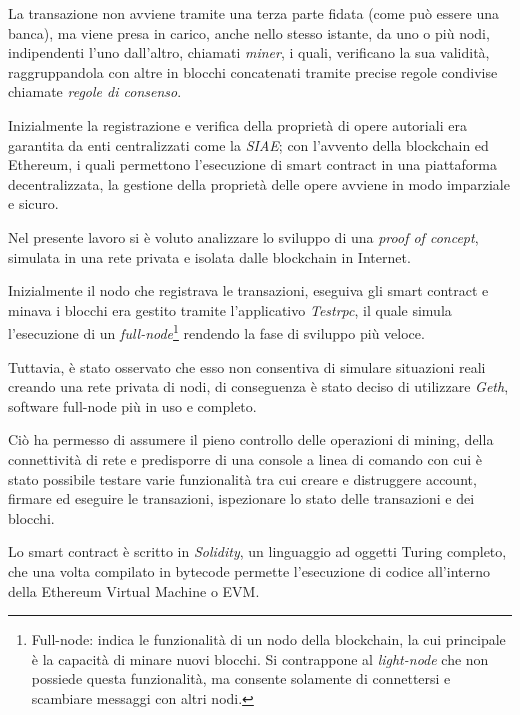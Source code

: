 \documentclass[11pt,oneside,a4paper]{article}
\begin{document}
	La transazione non avviene tramite una terza parte fidata (come può essere una banca), ma viene presa in carico, anche nello stesso istante, da uno o più nodi, indipendenti l'uno dall'altro, chiamati \textit{miner}, i quali, verificano la sua validità, raggruppandola con altre in blocchi concatenati tramite precise regole condivise chiamate \textit{regole di consenso}. %
	
	Inizialmente la registrazione e verifica della proprietà di opere autoriali era garantita da enti centralizzati come la \textit{SIAE}; con l'avvento della blockchain ed Ethereum, i quali permettono l'esecuzione di smart contract in una piattaforma decentralizzata, la gestione della proprietà delle opere avviene in modo imparziale e sicuro.

	
	Nel presente lavoro si è voluto analizzare lo sviluppo di una \textit{proof of concept}, simulata in una rete privata e isolata dalle blockchain in Internet. 
	
	Inizialmente il nodo che registrava le transazioni, eseguiva gli smart contract e minava i blocchi era gestito tramite l'applicativo \textit{Testrpc}, il quale simula l'esecuzione di un \textit{full-node}\footnote{Full-node: indica le funzionalità di un nodo della blockchain, la cui principale è la capacità di minare nuovi blocchi. Si contrappone al \textit{light-node} che non possiede questa funzionalità, ma consente solamente di connettersi e scambiare messaggi con altri nodi.} rendendo la fase di sviluppo più veloce. %
	
	Tuttavia, è stato osservato che esso non consentiva di simulare situazioni reali creando una rete privata di nodi, di conseguenza è stato deciso di utilizzare \textit{Geth}, software full-node più in uso e completo. 
	
	Ciò ha permesso di assumere il pieno controllo delle operazioni di mining, della connettività di rete e predisporre di una console a linea di comando con cui è stato possibile testare varie funzionalità tra cui creare e distruggere account, firmare ed eseguire le transazioni, ispezionare lo stato delle transazioni e dei blocchi.
	
	Lo smart contract è scritto in \textit{Solidity}, un linguaggio ad oggetti Turing completo, che una volta compilato in bytecode permette l'esecuzione di codice all'interno della Ethereum Virtual Machine o EVM.
	
\end{document}
